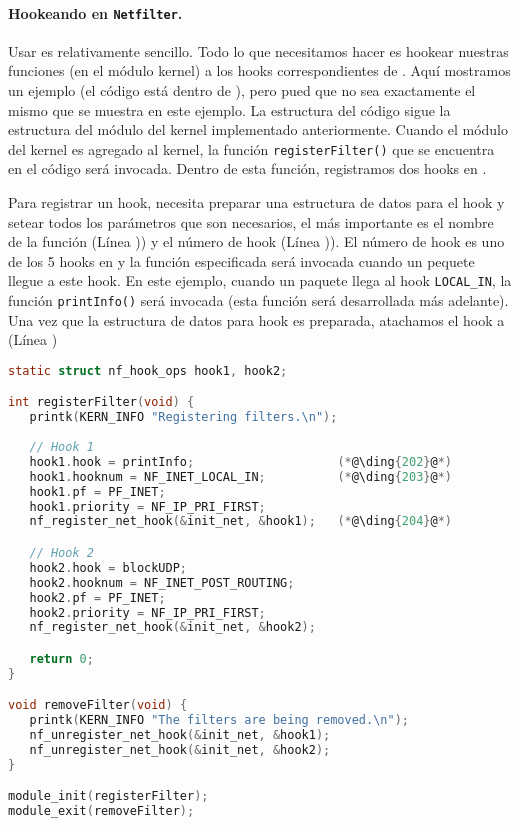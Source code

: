 \paragraph{Hookeando en \texttt{Netfilter}.} 

Usar \netfilter es relativamente sencillo. Todo lo que necesitamos hacer es hookear nuestras funciones (en el módulo kernel) a los hooks correspondientes de \netfilter. Aquí mostramos un ejemplo (el código está dentro de ), pero pued que no sea exactamente el mismo que se muestra en este ejemplo.
La estructura del código sigue la estructura del módulo del kernel implementado anteriormente. Cuando el módulo del kernel es agregado al kernel, la función \texttt{registerFilter()} que se encuentra en el código será invocada. Dentro de esta función, registramos dos hooks en \netfilter.

Para registrar un hook, necesita preparar una estructura de datos para el hook y setear todos los parámetros que son necesarios, el más importante es el nombre de la función (Línea )) y el número de hook (Línea )).
El número de hook es uno de los 5 hooks en \netfilter y la función especificada será invocada cuando un pequete llegue a este hook. En este ejemplo, cuando un paquete llega al hook \texttt{LOCAL\_IN}, la función \texttt{printInfo()} será invocada (esta función será desarrollada más adelante). Una vez que la estructura de datos para hook es preparada, atachamos el hook a \netfilter (Línea )


\begin{lstlisting}[language=C, caption={Register hook functions to \netfilter}]
static struct nf_hook_ops hook1, hook2;

int registerFilter(void) {
   printk(KERN_INFO "Registering filters.\n");
   
   // Hook 1
   hook1.hook = printInfo;                    (*@\ding{202}@*)
   hook1.hooknum = NF_INET_LOCAL_IN;          (*@\ding{203}@*)
   hook1.pf = PF_INET;
   hook1.priority = NF_IP_PRI_FIRST;
   nf_register_net_hook(&init_net, &hook1);   (*@\ding{204}@*)

   // Hook 2
   hook2.hook = blockUDP;
   hook2.hooknum = NF_INET_POST_ROUTING;
   hook2.pf = PF_INET;
   hook2.priority = NF_IP_PRI_FIRST;
   nf_register_net_hook(&init_net, &hook2);

   return 0;
}

void removeFilter(void) {
   printk(KERN_INFO "The filters are being removed.\n");
   nf_unregister_net_hook(&init_net, &hook1);
   nf_unregister_net_hook(&init_net, &hook2);
}

module_init(registerFilter);
module_exit(removeFilter);
\end{lstlisting}

